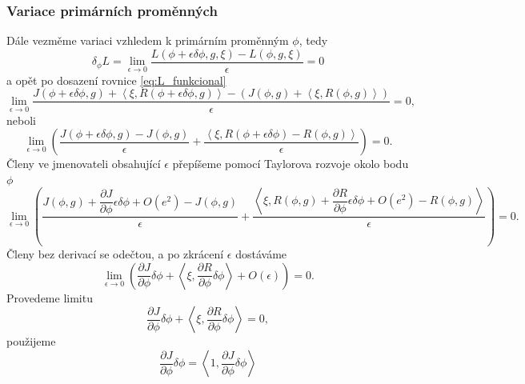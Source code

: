 \subsubsection{Variace primárních proměnných}
Dále vezměme variaci vzhledem k primárním proměnným $ \phi $, tedy
\begin{equation*}
\delta_\phi L =
\lim\limits_{\epsilon\rightarrow0}
\dfrac{L(\phi+\epsilon\delta\phi,g,\xi)-L(\phi,g,\xi)}
{\epsilon}
=0
\end{equation*}
a opět po dosazení rovnice \ref{eq:L_funkcional}
\begin{equation*}
\lim\limits_{\epsilon\rightarrow0} \dfrac
{J(\phi+\epsilon\delta\phi, g) + 
 \left\langle\xi , R(\phi+\epsilon\delta\phi, g) \right\rangle -  (J(\phi, g) +  \left\langle\xi , R(\phi, g)\right\rangle)}
{\epsilon}
=0,
\end{equation*}
neboli
\begin{equation*}
\lim\limits_{\epsilon\rightarrow 0} 
\left(
\dfrac
{J(\phi+\epsilon\delta\phi, g) - J(\phi, g)}
{\epsilon}
+
\dfrac
{  \left\langle\xi , R(\phi+\epsilon\delta\phi) - R(\phi, g)\right\rangle }
{\epsilon}
\right)
=0.
\end{equation*}
Členy ve jmenovateli obsahující $ \epsilon $ přepíšeme pomocí Taylorova rozvoje okolo bodu $ \phi $
\begin{equation*}
\lim\limits_{\epsilon\rightarrow 0} 
\left(
\dfrac
{J(\phi, g) + \dfrac{\partial J}{\partial \phi}\epsilon\delta\phi + O(e^2) - J(\phi, g)}
{\epsilon}
+
\dfrac
{  \left\langle\xi , R(\phi,g) + \dfrac{\partial R}{\partial \phi} \epsilon \delta\phi + O(e^2) - R(\phi,g)\right\rangle }
{\epsilon}
\right)
=0.
\end{equation*}
Členy bez derivací se odečtou, a po zkrácení $\epsilon$ dostáváme
\begin{equation*}
\lim\limits_{\epsilon\rightarrow 0} 
\left(
\dfrac{\partial J}{\partial \phi}\delta\phi
+  \left\langle\xi , \dfrac{\partial R}{\partial \phi} \delta\phi \right\rangle
+O(\epsilon)
\right)
=0.
\end{equation*}
Provedeme limitu 
\begin{equation}\label{eq:sdruzene_rce_variace}
\frac{\partial J}{\partial \phi}\delta\phi
+  \left\langle\xi , \dfrac{\partial R}{\partial \phi} \delta\phi\right\rangle
=0,
\end{equation}
použijeme 
\begin{equation*}
\frac{\partial J}{\partial \phi}\delta\phi = \left\langle 1, \frac{\partial J}{\partial \phi}\delta\phi \right\rangle
\end{equation*}

